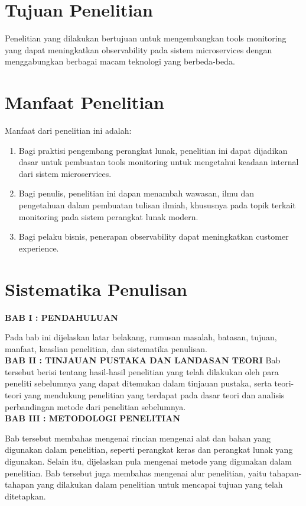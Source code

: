 \section{Tujuan Penelitian}
Penelitian yang dilakukan bertujuan untuk mengembangkan tools monitoring yang dapat meningkatkan observability pada sistem microservices dengan menggabungkan berbagai macam teknologi yang berbeda-beda. 

\section{Manfaat Penelitian}
Manfaat dari penelitian ini adalah:
\begin{enumerate}
\item Bagi praktisi pengembang perangkat lunak, penelitian ini dapat dijadikan dasar untuk pembuatan tools monitoring untuk mengetahui keadaan internal dari sistem microservices.
\item Bagi penulis, penelitian ini dapan menambah wawasan, ilmu dan pengetahuan dalam pembuatan tulisan ilmiah, khususnya pada topik terkait monitoring pada sistem perangkat lunak modern.
\item Bagi pelaku bisnis, penerapan observability dapat meningkatkan customer experience.\\
\end{enumerate}

\section{Sistematika Penulisan}
\noindent
\textbf{BAB I : PENDAHULUAN}

Pada bab ini dijelaskan latar belakang, rumusan masalah, batasan, tujuan, manfaat, keaslian penelitian, dan sistematika penulisan.\\

\noindent
\textbf{BAB II : TINJAUAN PUSTAKA DAN LANDASAN TEORI}
Bab tersebut berisi tentang hasil-hasil penelitian yang telah dilakukan oleh para peneliti sebelumnya yang dapat ditemukan dalam tinjauan pustaka, serta teori-teori yang mendukung penelitian yang terdapat pada dasar teori dan analisis perbandingan metode dari penelitian sebelumnya.\\

\noindent
\textbf{BAB III : METODOLOGI PENELITIAN}

Bab tersebut membahas mengenai rincian mengenai alat dan bahan yang digunakan dalam penelitian, seperti perangkat keras dan perangkat lunak yang digunakan. Selain itu, dijelaskan pula mengenai metode yang digunakan dalam penelitian. Bab tersebut juga membahas mengenai alur penelitian, yaitu tahapan-tahapan yang dilakukan dalam penelitian untuk mencapai tujuan yang telah ditetapkan.\\

